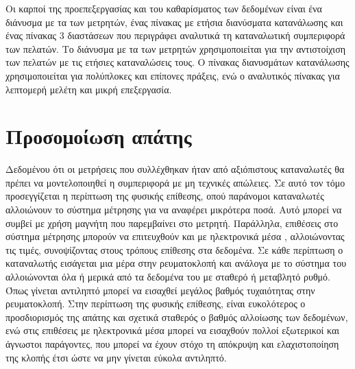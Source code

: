 Οι καρποί της προεπεξεργασίας και του καθαρίσματος των δεδομένων είναι ένα διάνυσμα με τα  των μετρητών, ένας πίνακας με ετήσια διανύσματα κατανάλωσης και ένας πίνακας 3 διαστάσεων που περιγράφει αναλυτικά τη καταναλωτική συμπεριφορά των πελατών. Το διάνυσμα με τα  των μετρητών χρησιμοποιείται για την αντιστοίχιση των πελατών με τις ετήσιες καταναλώσεις τους. Ο πίνακας διανυσμάτων κατανάλωσης χρησιμοποιείται για πολύπλοκες και επίπονες πράξεις, ενώ ο αναλυτικός πίνακας για λεπτομερή μελέτη και μικρή επεξεργασία.
\section{Προσομοίωση απάτης}
Δεδομένου ότι οι μετρήσεις που συλλέχθηκαν ήταν από αξιόπιστους καταναλωτές θα πρέπει να μοντελοποιηθεί η συμπεριφορά με μη τεχνικές απώλειες. Σε αυτό τον τόμο προσεγγίζεται η περίπτωση της φυσικής επίθεσης, οπού παράνομοι καταναλωτές αλλοιώνουν το σύστημα μέτρησης για να αναφέρει μικρότερα ποσά. Αυτό μπορεί να συμβεί με χρήση μαγνήτη που παρεμβαίνει στο μετρητή. Παράλληλα, επιθέσεις στο σύστημα μέτρησης μπορούν να επιτευχθούν και με ηλεκτρονικά μέσα , αλλοιώνοντας τις τιμές, συνοψίζοντας στους τρόπους επίθεσης στα δεδομένα. Σε κάθε περίπτωση ο καταναλωτής εισάγεται μια μέρα στην ρευματοκλοπή και ανάλογα με το σύστημα του αλλοιώνονται όλα ή μερικά από τα δεδομένα του με σταθερό ή μεταβλητό ρυθμό. Όπως γίνεται αντιληπτό μπορεί να εισαχθεί μεγάλος βαθμός τυχαιότητας στην ρευματοκλοπή. Στην περίπτωση της φυσικής επίθεσης, είναι ευκολότερος ο προσδιορισμός της απάτης και σχετικά σταθερός ο βαθμός αλλοίωσης των δεδομένων, ενώ στις επιθέσεις με ηλεκτρονικά μέσα μπορεί να εισαχθούν πολλοί εξωτερικοί και άγνωστοι παράγοντες, που μπορεί να έχουν στόχο τη απόκρυψη και ελαχιστοποίηση της κλοπής έτσι ώστε να μην γίνεται εύκολα αντιληπτό.
